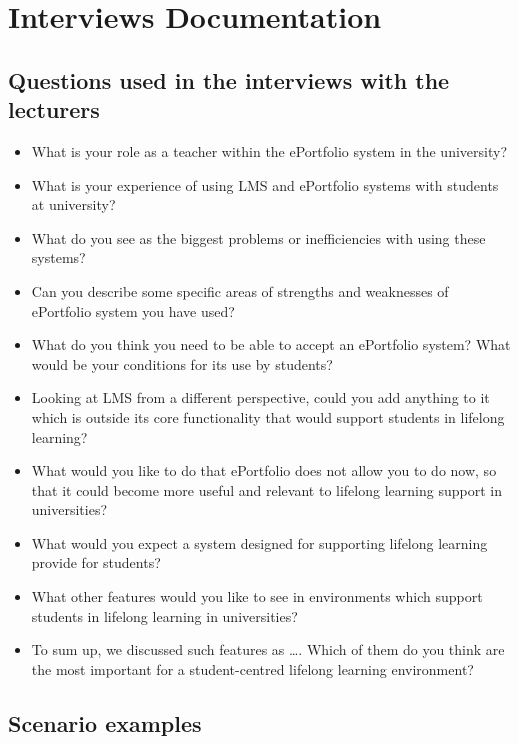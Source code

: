 \chapter{Interviews Documentation \label{cha:interviews}}

\section{Questions used in the interviews with the lecturers}

\begin{itemize}
\item What is your role as a teacher within the ePortfolio system in the
university?

\item What is your experience of using LMS and ePortfolio systems with students
at university?

\item What do you see as the biggest problems or inefficiencies with using these
systems?

\item Can you describe some specific areas of strengths and weaknesses of
ePortfolio system you have used?

\item What do you think you need to be able to accept an ePortfolio system? What
would be your conditions for its use by students?

\item Looking at LMS from a different perspective, could you add anything to it
which is outside its core functionality that would support students in lifelong
learning?

\item What would you like to do that ePortfolio does not allow you to do now, so
that it could become more useful and relevant to lifelong learning support in
universities?

\item What would you expect a system designed for supporting lifelong learning
provide for students?

\item What other features would you like to see in environments which support
students in lifelong learning in universities?

\item To sum up, we discussed such features as \ldots. Which of them do you
think are the most important for a student-centred lifelong learning environment?
\end{itemize}

\section{Scenario examples}